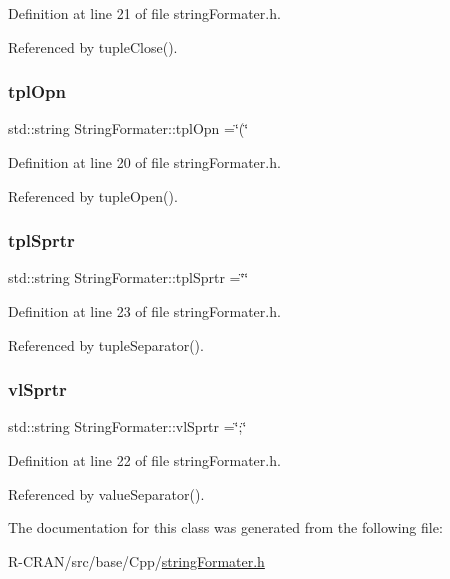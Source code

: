 Definition at line 21 of file string\+Formater.\+h.



Referenced by tuple\+Close().

\mbox{\label{classStringFormater_a021c71f2e67718053bf9dcc3107cb204}} 
\subsubsection{\texorpdfstring{tpl\+Opn}{tplOpn}}
{\footnotesize\ttfamily std\+::string String\+Formater\+::tpl\+Opn =\char`\"{}(\char`\"{}\hspace{0.3cm}{\ttfamily [private]}}



Definition at line 20 of file string\+Formater.\+h.



Referenced by tuple\+Open().

\mbox{\label{classStringFormater_a10b02d7f29048b2e90d7c59a656ed5db}} 
\subsubsection{\texorpdfstring{tpl\+Sprtr}{tplSprtr}}
{\footnotesize\ttfamily std\+::string String\+Formater\+::tpl\+Sprtr =\char`\"{}\char`\"{}\hspace{0.3cm}{\ttfamily [private]}}



Definition at line 23 of file string\+Formater.\+h.



Referenced by tuple\+Separator().

\mbox{\label{classStringFormater_a6749d9c5fe85817f9232bf7987e2a28e}} 
\subsubsection{\texorpdfstring{vl\+Sprtr}{vlSprtr}}
{\footnotesize\ttfamily std\+::string String\+Formater\+::vl\+Sprtr =\char`\"{};\char`\"{}\hspace{0.3cm}{\ttfamily [private]}}



Definition at line 22 of file string\+Formater.\+h.



Referenced by value\+Separator().



The documentation for this class was generated from the following file\+:\begin{DoxyCompactItemize}
\item 
R-\/\+C\+R\+A\+N/src/base/\+Cpp/\hyperlink{stringFormater_8h}{string\+Formater.\+h}\end{DoxyCompactItemize}
